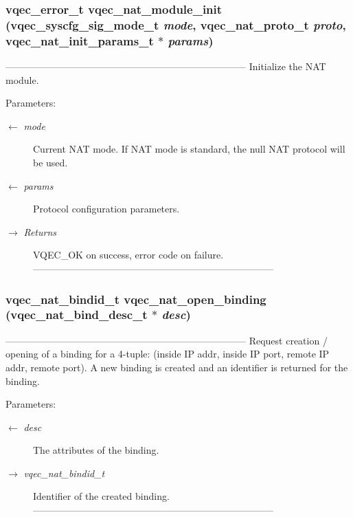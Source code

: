 \subsubsection{\setlength{\rightskip}{0pt plus 5cm}vqec\_\-error\_\-t vqec\_\-nat\_\-module\_\-init (\bf{vqec\_\-syscfg\_\-sig\_\-mode\_\-t} {\em mode}, vqec\_\-nat\_\-proto\_\-t {\em proto}, vqec\_\-nat\_\-init\_\-params\_\-t $\ast$ {\em params})}\label{vqec__nat__interface_8h_83633147de37d3301648f68a352304ea}


--------------------------------------------------------------------------- Initialize the NAT module.

\begin{Desc}
\item[Parameters:]
\begin{description}
\item[\mbox{$\leftarrow$} {\em mode}]Current NAT mode. If NAT mode is standard, the null NAT protocol will be used. \item[\mbox{$\leftarrow$} {\em params}]Protocol configuration parameters. \item[\mbox{$\rightarrow$} {\em Returns}]VQEC\_\-OK on success, error code on failure. --------------------------------------------------------------------------- \end{description}
\end{Desc}
\subsubsection{\setlength{\rightskip}{0pt plus 5cm}vqec\_\-nat\_\-bindid\_\-t vqec\_\-nat\_\-open\_\-binding (vqec\_\-nat\_\-bind\_\-desc\_\-t $\ast$ {\em desc})}\label{vqec__nat__interface_8h_c74d504ee5e09aabf2362fd74f414fb0}


--------------------------------------------------------------------------- Request creation / opening of a binding for a 4-tuple: (inside IP addr, inside IP port, remote IP addr, remote port). A new binding is created and an identifier is returned for the binding.

\begin{Desc}
\item[Parameters:]
\begin{description}
\item[\mbox{$\leftarrow$} {\em desc}]The attributes of the binding. \item[\mbox{$\rightarrow$} {\em vqec\_\-nat\_\-bindid\_\-t}]Identifier of the created binding. --------------------------------------------------------------------------- \end{description}
\end{Desc}

